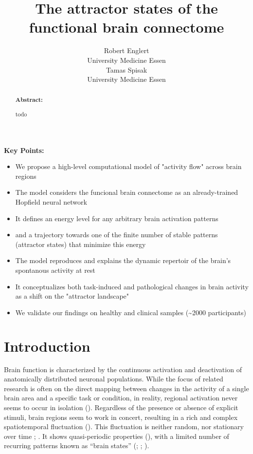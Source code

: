 \documentclass{article}
\title{The attractor states of the functional brain connectome}
\date{\displaydate{articleDate}}
\author{Robert Englert\\
University Medicine Essen\\\AND
Tamas Spisak\footnotemark[1]\\
University Medicine Essen\\}
\begin{document}
\maketitle
{}

\begin{abstract}
\textbf{Abstract:}

todo
\end{abstract}

\keywords{}

\textbf{Key Points:}

\begin{itemize}
\item We propose a high-level computational model of "activity flow" across brain regions
\item The model considers the funcional brain connectome as an already-trained Hopfield neural network
\item It defines an energy level for any arbitrary brain activation patterns
\item and a trajectory towards one of the finite number of stable patterns (attractor states) that minimize this energy
\item The model reproduces and explains the dynamic repertoir of the brain's spontanous activity at rest
\item It conceptualizes both task-induced and pathological changes in brain activity as a shift on the "attractor landscape"
\item We validate our findings on healthy and clinical samples ({\textasciitilde}2000 participants)
\end{itemize}

\section{Introduction}\label{Introduction}

Brain function is characterized by the continuous activation and deactivation of anatomically distributed neuronal populations.
While the focus of related research is often on the direct mapping between changes in the activity of a single brain area and a specific task or condition, in reality, regional activation never seems to occur in isolation (\cite{Bassett_2017}).
Regardless of the presence or absence of explicit stimuli, brain regions seem to work in concert, resulting in a rich and complex spatiotemporal fluctuation (\href{https://doi.org/10.1016/j.cub.2019.06.017}{}).
This fluctuation is neither random, nor stationary over time \cite{Liu_2013}; \cite{Zalesky_2014}. It shows quasi-periodic properties (\cite{Thompson_2014}), with a limited number of recurring patterns known as ``brain states'' (\href{https://doi.org/10.1073/pnas.1705120114}{}; \href{https://doi.org/10.1073/pnas.1216856110}{}; \cite{Richiardi_2011}).
\end{document}

